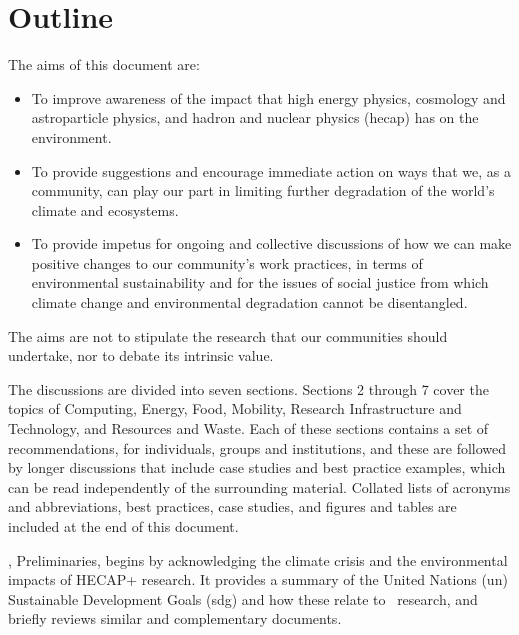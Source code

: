 \documentclass[../SustainableHEP.tex]{subfiles}
\begin{document}
\RaggedRight
\sloppy


\section*{Outline}

The aims of this document are:
\begin{itemize}
    \item To improve awareness of the impact that high energy physics, cosmology and astroparticle physics, and hadron and nuclear physics (\acrshort{hecap}) has on the environment.
    \item To provide suggestions and encourage immediate action on ways that we, as a community, can play our part in limiting further degradation of the world's climate and ecosystems.
    \item To provide impetus for ongoing and collective discussions of how we can make positive changes to our community's work practices, in terms of environmental sustainability and for the issues of social justice from which climate change and environmental degradation cannot be disentangled.
\end{itemize}
The aims are not to stipulate the research that our communities should undertake, nor to debate its intrinsic value.

The discussions are divided into seven sections. Sections 2 through 7 cover the topics of Computing, Energy, Food, Mobility, Research Infrastructure and Technology, and Resources and Waste. Each of these sections contains a set of recommendations, for individuals, groups and institutions, and these are followed by longer discussions that include case studies and best practice examples, which can be read independently of the surrounding material. Collated lists of acronyms and abbreviations, best practices, case studies, and figures and tables are included at the end of this document.

, Preliminaries, begins by acknowledging the climate crisis and the environmental impacts of HECAP+ research. It provides a summary of the United Nations (\acrshort{un}) Sustainable Development Goals (\acrshort{sdg}) and how these relate to \ACR\ research, and briefly reviews similar and complementary documents.

\end{document}
